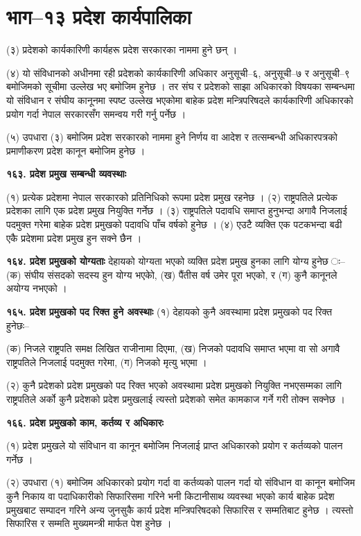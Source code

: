 \section{भाग–१३ प्रदेश कार्यपालिका}

(३) प्रदेशको कार्यकारिणी कार्यहरू प्रदेश सरकारका नाममा हुने छन् ।

(४) यो संविधानको अधीनमा रही प्रदेशको कार्यकारिणी अधिकार अनुसूची–६, अनुसूची–७ र अनुसूची–९ बमोजिमको सूचीमा उल्लेख भए
बमोजिम हुनेछ । तर संघ र प्रदेशको साझा अधिकारको विषयका सम्बन्धमा यो संविधान र संघीय कानूनमा स्पष्ट उल्लेख भएकोमा बाहेक प्रदेश मन्त्रिपरिषदले कार्यकारिणी अधिकारको प्रयोग गर्दा नेपाल सरकारसँग समन्वय गरी गर्नु पर्नेछ ।

(५) उपधारा (३) बमोजिम प्रदेश सरकारको नाममा हुने निर्णय वा आदेश र तत्सम्बन्धी अधिकारपत्रको प्रमाणीकरण प्रदेश कानून बमोजिम
हुनेछ ।

\textbf{१६३. प्रदेश प्रमुख सम्बन्धी व्यवस्थाः}

(१) प्रत्येक प्रदेशमा नेपाल सरकारको प्रतिनिधिको रूपमा प्रदेश प्रमुख रहनेछ ।
(२) राष्ट्रपतिले प्रत्येक प्रदेशका लागि एक प्रदेश प्रमुख नियुक्ति गर्नेछ ।
(३) राष्ट्रपतिले पदावधि समाप्त हुनुभन्दा अगावै निजलाई पदमुक्त गरेमा बाहेक प्रदेश प्रमुखको पदावधि पाँच वर्षको हुनेछ ।
(४) एउटै व्यक्ति एक पटकभन्दा बढी एकै प्रदेशमा प्रदेश प्रमुख हुन सक्ने छैन ।

\textbf{१६४. प्रदेश प्रमुखको योग्यताः} देहायको योग्यता भएको व्यक्ति प्रदेश प्रमुख हुनका लागि योग्य हुनेछ ः–
(क) संघीय संसदको सदस्य हुन योग्य भएकोे,
(ख) पैंतीस वर्ष उमेर पूरा भएको, र
(ग) कुनै कानूनले अयोग्य नभएको ।

\textbf{१६५. प्रदेश प्रमुखको पद रिक्त हुने अवस्थाः} (१) देहायको कुनै अवस्थामा प्रदेश प्रमुखको पद रिक्त हुनेछः–

(क) निजले राष्ट्रपति समक्ष लिखित राजीनामा दिएमा,
(ख) निजको पदावधि समाप्त भएमा वा सो अगावै राष्ट्रपतिले निजलाई पदमुक्त गरेमा,
(ग) निजको मृत्यु भएमा ।

(२) कुनै प्रदेशको प्रदेश प्रमुखको पद रिक्त भएको अवस्थामा प्रदेश प्रमुखको नियुक्ति नभएसम्मका लागि राष्ट्रपतिले अर्को कुनै प्रदेशको प्रदेश प्रमुखलाई त्यस्तो प्रदेशको समेत कामकाज गर्ने गरी तोक्न सक्नेछ ।

\textbf{१६६. प्रदेश प्रमुखको काम, कर्तव्य र अधिकारः}

(१) प्रदेश प्रमुखले यो संविधान वा कानून बमोजिम निजलाई प्राप्त अधिकारको प्रयोग र कर्तव्यको पालन गर्नेछ ।

(२) उपधारा (१) बमोजिम अधिकारको प्रयोग गर्दा वा कर्तव्यको पालन गर्दा यो संविधान वा कानून बमोजिम कुनै निकाय वा पदाधिकारीको
सिफारिसमा गरिने भनी किटानीसाथ व्यवस्था भएको कार्य बाहेक प्रदेश प्रमुखबाट सम्पादन गरिने अन्य जुनसुकै कार्य प्रदेश मन्त्रिपरिषदको सिफारिस र सम्मतिबाट हुनेछ । त्यस्तो सिफारिस र सम्मति मुख्यमन्त्री मार्फत पेश हुनेछ ।

